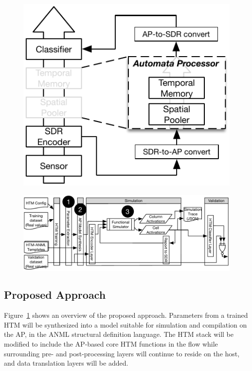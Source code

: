 \begin{figure}
\centering
\begin{minipage}{.5\textwidth}
  \centering
  \includegraphics[width=.66\linewidth]{figs/HTM_AP_Architecture_Diagram.pdf}
  \label{fig:test1}
\end{minipage}%
\begin{minipage}{.5\textwidth}
  \centering
  \includegraphics[width=\linewidth]{figs/HTM_AP_Workflow.pdf}
  \label{fig:HTM_AP_Architecture_Diagram}
\end{minipage}
\end{figure}

\subsection{Proposed Approach}

Figure~\ref{fig:HTM_AP_Architecture_Diagram} shows an overview of the proposed approach.
Parameters from a trained HTM will be synthesized into a model suitable for simulation and compilation on the AP, in the ANML structural definition language.
The HTM stack will be modified to include the AP-based core HTM functions in the flow while surrounding pre- and post-processing layers will continue to reside on the host, and data translation layers will be added. 


